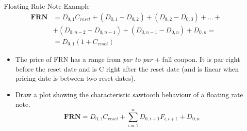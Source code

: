 \documentclass{beamer}
\begin{document}
\begin{frame}{Floating Rate Note Example}
\begin{equation*}
\begin{aligned}
\textbf{FRN} & = D_{0,1}C_{reset} + (D_{0,1} - D_{0,2}) +(D_{0,2} - D_{0,3}) + \ldots + \\
& + (D_{0,n-2} - D_{0,n-1}) + (D_{0,n-1} - D_{0,n}) + D_{0,n} = \\
& = \boxed{D_{0,1} (1 +C_{reset})}
\end{aligned}
\end{equation*}
\begin{itemize}
\item The price of FRN has a range from \emph{par to par} + full coupon. It is par right before the reset date and is C right after the reset date (and is linear when pricing date is between two reset dates).
\item Draw a plot showing the characteristic sawtooth behaviour of a floating rate note. 
\begin{equation*}
\textbf{FRN} = D_{0,1}C_{reset} + \sum_{i=1}^nD_{0,i+1}F_{i,i+1} + D_{0,n}
\end{equation*}
\end{itemize}
\end{frame}
\end{document}
